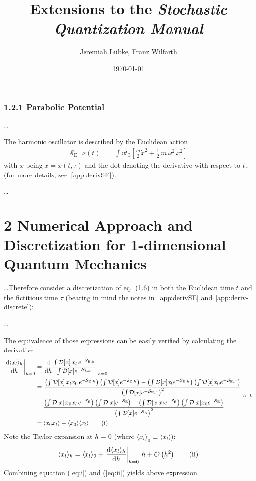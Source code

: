 \documentclass[11pt,a4paper]{scrartcl}
\title{Extensions to the \emph{Stochastic Quantization Manual}}
\author{Jeremiah Lübke, Franz Wilfarth}
\date{\today}
\newcommand{\action}{\ensuremath{\mathcal{S}}}
\newcommand{\avg}[1]{\langle#1\rangle}
\newcommand{\SE}{\ensuremath{\mathcal{S}_{\mathrm{E}}}}
\newcommand{\SEh}{\mathcal{S}_{\mathrm{E},h}}
\newcommand{\pathinth}[1]{\int\mathcal{D}[x]#1e^{-\SEh}}
\newcommand{\pathint}[1]{\int\mathcal{D}[x]#1e^{-\SE}}
\newcommand{\BigO}[1]{\mathcal{O}\left(#1\right)}
\begin{document}
\maketitle

\subsubsection*{1.2.1 Parabolic Potential}
\dots

The harmonic oscillator is described by the Euclidean action
\begin{align}
    \action_\mathrm{E}\left[x(t)\right] =
    \int\dd{t_\mathrm{E}}\left[\frac{m}{2}\dot{x}^2 +
        \frac{1}{2}\,m\,\omega^2\,x^2\right]
\end{align}
with $x$ being $x = x(t, \tau )$ and the dot denoting the derivative with
respect to $t_\mathrm{E}$ (for more details, see~\ref{app:derivSE}).

\dots


\section*{2 Numerical Approach and Discretization for 1-dimensional Quantum
Mechanics}
\dots Therefore consider a discretization of eq.~(1.6) in
both the Euclidean time $t$ and the fictitious time $\tau$ (bearing in mind the
notes in~\ref{app:derivSE} and~\ref{app:deriv-discrete}):

\dots

The equivalence of those expressions can be easily verified by calculating the
derivative
\begin{align*}
    \eval{\dv{\avg{x_l}_h}{h}}_{h=0} &=
    \eval{\dv{h}\frac{\pathinth{\,x_l\,}}{\pathinth{}}}_{h=0} \\ &=
    \eval{\frac{\left(\pathinth{\,x_l x_0\,}\right)\left(\pathinth{}\right)
    -\left(\pathinth{x_l}\right)\left(\pathinth{x_0}\right)}
    {\left(\pathinth{}\right)^2}}_{h=0} \\ &=
    \frac{\left(\pathint{\,x_0 x_l\,}\right)\left(\pathint{}\right)
    -\left(\pathint{x_l}\right)\left(\pathint{x_0}\right)}
    {\left(\pathint{}\right)^2} \\ &=
    \avg{x_0 x_l}-\avg{x_0}\avg{x_l} \tag{i}\label{eq:i}
\end{align*}
Note the Taylor expansion at $h=0$ (where $\avg{x_l}_0\equiv\avg{x_l}$):
\begin{equation*}
    \avg{x_l}_h=\avg{x_l}_0+\eval{\dv{\avg{x_l}_h}{h}}_{h=0}\,h+\BigO{h^2}
    \tag{ii}\label{eq:ii}
\end{equation*}
Combining equation (\ref{eq:i}) and (\ref{eq:ii}) yields above expression.
\end{document}
